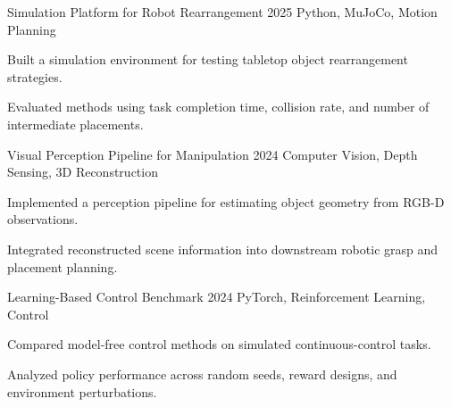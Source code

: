 
\VectraProjectEntry
    {Simulation Platform for Robot Rearrangement}
    {2025}
    {Python, MuJoCo, Motion Planning}
    {
        \item Built a simulation environment for testing tabletop object rearrangement strategies.
        \item Evaluated methods using task completion time, collision rate, and number of intermediate placements.
    }

\VectraProjectEntry
    {Visual Perception Pipeline for Manipulation}
    {2024}
    {Computer Vision, Depth Sensing, 3D Reconstruction}
    {
        \item Implemented a perception pipeline for estimating object geometry from RGB-D observations.
        \item Integrated reconstructed scene information into downstream robotic grasp and placement planning.
    }

\VectraProjectEntry
    {Learning-Based Control Benchmark}
    {2024}
    {PyTorch, Reinforcement Learning, Control}
    {
        \item Compared model-free control methods on simulated continuous-control tasks.
        \item Analyzed policy performance across random seeds, reward designs, and environment perturbations.
    }